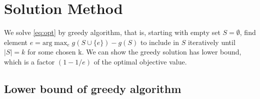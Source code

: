 \documentclass[12pt]{article}
\newcommand{\E}{\mathbb{E}}
\newcommand{\EI}{\mathrm{EI}}
\begin{document}
\section{Solution Method}
We solve \eqref{eq:opt} by greedy algorithm, that is, starting with empty set $S=\emptyset$, find element $e = \mathrm{arg}\max_e g(S \cup \{e\})-g(S)$ to include in $S$ iteratively until $|S|=k$ for some chosen k. We can show the greedy solution has lower bound, which is a factor $(1-1/ e)$ of the optimal objective value.
\subsection{Lower bound of greedy algorithm}
\end{document}
